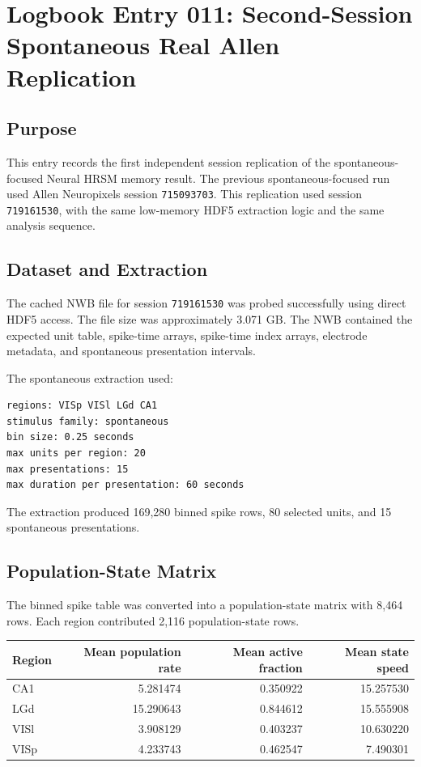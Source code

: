 \section{Logbook Entry 011: Second-Session Spontaneous Real Allen Replication}
\label{sec:logbook-entry-011-second-session-spontaneous-replication}

\subsection{Purpose}

This entry records the first independent session replication of the spontaneous-focused Neural HRSM memory result. The previous spontaneous-focused run used Allen Neuropixels session \texttt{715093703}. This replication used session \texttt{719161530}, with the same low-memory HDF5 extraction logic and the same analysis sequence.

\subsection{Dataset and Extraction}

The cached NWB file for session \texttt{719161530} was probed successfully using direct HDF5 access. The file size was approximately 3.071 GB. The NWB contained the expected unit table, spike-time arrays, spike-time index arrays, electrode metadata, and spontaneous presentation intervals.

The spontaneous extraction used:

\begin{verbatim}
regions: VISp VISl LGd CA1
stimulus family: spontaneous
bin size: 0.25 seconds
max units per region: 20
max presentations: 15
max duration per presentation: 60 seconds
\end{verbatim}

The extraction produced 169,280 binned spike rows, 80 selected units, and 15 spontaneous presentations.

\subsection{Population-State Matrix}

The binned spike table was converted into a population-state matrix with 8,464 rows. Each region contributed 2,116 population-state rows.

\begin{center}
\begin{tabular}{lrrr}
\hline
Region & Mean population rate & Mean active fraction & Mean state speed \\
\hline
CA1 & 5.281474 & 0.350922 & 15.257530 \\
LGd & 15.290643 & 0.844612 & 15.555908 \\
VISl & 3.908129 & 0.403237 & 10.630220 \\
VISp & 4.233743 & 0.462547 & 7.490301 \\
\hline
\end{tabular}
\end{center}

